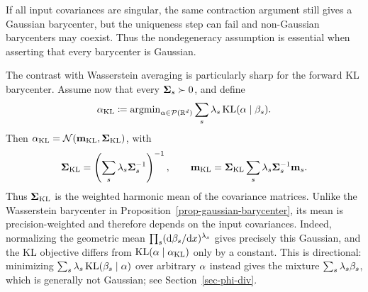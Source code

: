 If all input covariances are singular, the same contraction argument still gives a Gaussian barycenter, but the uniqueness step can fail and non-Gaussian barycenters may coexist. Thus the nondegeneracy assumption is essential when asserting that every barycenter is Gaussian.

\begin{rem}
	The contrast with Wasserstein averaging is particularly sharp for the forward KL barycenter. Assume now that every \(\mathbf{\Sigma}_s\succ0\), and define
	\[
		\alpha_{\mathrm{KL}}
		\coloneqq
		\operatorname{argmin}_{\alpha\in\mathcal{P}(\mathbb{R}^d)}
		\sum_s\lambda_s\operatorname{KL}(\alpha\mid\beta_s).
	\]
	Then \(\alpha_{\mathrm{KL}}=\mathcal{N}(\mathbf{m}_{\mathrm{KL}},\mathbf{\Sigma}_{\mathrm{KL}})\), with
	\[
		\mathbf{\Sigma}_{\mathrm{KL}}
		=
		\left(\sum_s\lambda_s\mathbf{\Sigma}_s^{-1}\right)^{-1},
		\qquad
		\mathbf{m}_{\mathrm{KL}}
		=
		\mathbf{\Sigma}_{\mathrm{KL}}
		\sum_s\lambda_s\mathbf{\Sigma}_s^{-1}\mathbf{m}_s.
	\]
	Thus \(\mathbf{\Sigma}_{\mathrm{KL}}\) is the weighted harmonic mean of the covariance matrices. Unlike the Wasserstein barycenter in Proposition~\ref{prop-gaussian-barycenter}, its mean is precision-weighted and therefore depends on the input covariances. Indeed, normalizing the geometric mean \(\prod_s(\mathrm{d}\beta_s/\mathrm{d} x)^{\lambda_s}\) gives precisely this Gaussian, and the KL objective differs from \(\operatorname{KL}(\alpha\mid\alpha_{\mathrm{KL}})\) only by a constant. This is directional: minimizing \(\sum_s\lambda_s\operatorname{KL}(\beta_s\mid\alpha)\) over arbitrary \(\alpha\) instead gives the mixture \(\sum_s\lambda_s\beta_s\), which is generally not Gaussian; see Section~\ref{sec-phi-div}.
\end{rem}

